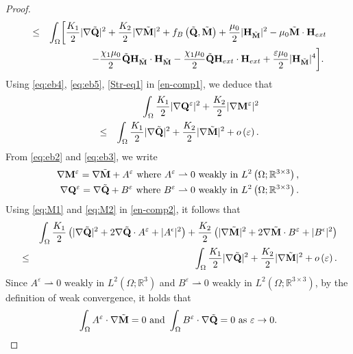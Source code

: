 \documentclass{article}
\def\Qvec{\mathbf{Q}}
\def \Mvec{\mathbf{M}}
\def\Hvec{\mathbf{H}}
\begin{document}
\begin{proof}
\begin{eqnarray}
&\le&\int_{\Omega} \biggl[\frac{K_1}{2}|\nabla \Tilde{\Qvec}|^2 + \frac{K_2}{2}|\nabla \Tilde{\Mvec}|^2 + f_B\left(\Tilde{\Qvec}, \Tilde{\Mvec}\right) + \frac{\mu_0}{2}|\Hvec_{\Tilde{\Mvec}}|^2 - \mu_0\Tilde{\Mvec}\cdot \Hvec_{ext}\nonumber\\
& &~~~~~~~- \frac{\chi_1\mu_0}{2}\Tilde{\Qvec}\Hvec_{\Tilde{\Mvec}}\cdot\Hvec_{\Tilde{\Mvec}} - \frac{\chi_1\mu_0}{2}\Tilde{\Qvec}\Hvec_{ext}\cdot\Hvec_{ext}+\frac{\varepsilon\mu_0}{2}|\Hvec_{\Tilde{\Mvec}}|^4\biggr].\;\label{en-comp1}
\end{eqnarray}
Using \eqref{eq:eb4}, \eqref{eq:eb5}, \eqref{Str-eq1} in \eqref{en-comp1}, we deduce that
\begin{eqnarray}
& &\int_{\Omega} \frac{K_1}{2}|\nabla \Qvec^{\varepsilon}|^2 + \frac{K_2}{2}|\nabla \Mvec^{\varepsilon}|^2\nonumber\\
&\le& \int_{\Omega} \frac{K_1}{2}|\nabla \Tilde{\Qvec}|^2 + \frac{K_2}{2}|\nabla \Tilde{\Mvec}|^2 + o\left(\varepsilon\right).\label{en-comp2}
\end{eqnarray}
From \eqref{eq:eb2} and \eqref{eq:eb3}, we write
\begin{eqnarray}
\nabla\Mvec^{\varepsilon}=\nabla\Tilde{\Mvec} + A^{\varepsilon} \mbox{ where } A^{\varepsilon}\rightharpoonup 0 \mbox{ weakly in } L^2\left(\Omega; \mathbb R^{3\times 3}\right),\label{eq:M1}\\
\nabla\Qvec^{\varepsilon}=\nabla\Tilde{\Qvec} + B^{\varepsilon} \mbox{ where } B^{\varepsilon}\rightharpoonup 0 \mbox{ weakly in } L^2\left(\Omega; \mathbb R^{3\times 3}\right)\label{eq:M2}.
\end{eqnarray}
Using \eqref{eq:M1} and \eqref{eq:M2} in \eqref{en-comp2}, it follows that
\begin{eqnarray}
& &\int_{\Omega} \frac{K_1}{2}\left(|\nabla\Tilde{\Qvec}|^2+2\nabla\Tilde{\Qvec}\cdot A^{\varepsilon} + |A^{\epsilon}|^2\right) + \frac{K_2}{2}\left(|\nabla\Tilde{\Mvec}|^2+2\nabla\Tilde{\Mvec}\cdot B^{\varepsilon} + |B^{\epsilon}|^2\right)\nonumber\\
&\le& \int_{\Omega} \frac{K_1}{2}|\nabla \Tilde{\Qvec}|^2 + \frac{K_2}{2}|\nabla \Tilde{\Mvec}|^2 + o\left(\varepsilon\right).\label{en_comp3}
\end{eqnarray}
Since $A^{\varepsilon}\rightharpoonup 0 \mbox{ weakly in } L^2\left(\Omega; \mathbb R^3\right)$ and $B^{\varepsilon}\rightharpoonup 0 \mbox{ weakly in } L^2\left(\Omega; \mathbb R^{3\times 3}\right)$, by the definition of weak convergence, it holds that
\begin{eqnarray}
\int_{\Omega}A^{\varepsilon}\cdot\nabla\Tilde{\Mvec}=0\mbox{ and }\int_{\Omega}B^{\varepsilon}\cdot\nabla\Tilde{\Qvec}=0 \mbox{ as } \varepsilon\rightarrow 0.

\end{eqnarray}
\end{proof}
\end{document}
